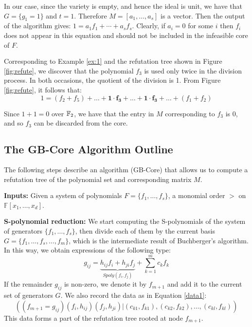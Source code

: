\begin{Proof}
In our case, since the variety is empty, and hence the ideal is
unit, we have that $G = \{g_1=1\}$ and $t=1$. Therefore $M=
[a_1, \ldots, a_s]$ is a vector. Then the output of the algorithm
gives: $1 = a_1f_1+\cdots + a_s f_s.$ Clearly, if $a_i=0$ for some $i$ then
$f_i$ does not appear in this equation and should not be included in
the infeasible core of $F$. 

\end{Proof}


\begin{Example}

Corresponding to Example \ref{ex:1} and the refutation tree shown in
Figure \ref{fig:refute}, we discover that the polynomial $f_3$ is used
only twice in the division process. In both occasions, the quotient of
the division is 1. From Figure \ref{fig:refute}, it follows that:
\begin{equation}
1 = (f_2 + f_5) + \dots + \mathbf{1\cdot f_3} + \dots + \mathbf{1\cdot
  f_3}+ \dots + (f_1 + f_2)
\end{equation}

Since $1 + 1 = 0$ over ${\mathbb{F}}_2$, we have that the entry in $M$
corresponding to $f_3$ is 0, and so $f_3$ can be discarded from the
core. 
\end{Example}

\subsection{The GB-Core Algorithm Outline}

The following steps describe an algorithm (GB-Core) that allows us to compute a
refutation tree of the polynomial set and corresponding matrix $M$. 

{\bf Inputs:} Given a system of polynomials $F=\{f_1,\ldots,f_s\}$, a
monomial order $>$ on $\mathbb{F}[x_1,\ldots,x_d]$.  

{\bf S-polynomial reduction:} We start computing the S-polynomials of the system of
generators $\{f_1,\ldots,f_s\}$, then divide each of them by the
current basis $G=\{f_1,\dots,f_s,\dots,f_m\}$, which is the
intermediate result of Buchberger's algorithm.  
In this way, we obtain expressions of the following type:
\begin{equation}
\label{eqn:red}
g_{ij}= \underbrace{h_{ij}f_{i}+h_{ji}f_{j}}_{Spoly(f_i,f_j)}+\displaystyle\sum_{k=1}^m c_kf_k
\end{equation}
If the remainder $g_{ij}$ is non-zero, we denote it by
$f_{m+1}$ and add it to the current set of generators $G$. We
also record the data as in Equation \ref{data1}: 
\begin{displaymath}
((f_{m+1}=g_{ij})(f_{i},h_{ij})(f_{j},h_{ji})| (c_{k1},f_{k1}),(c_{k2},f_{k2}),\dots,(c_{kl},f_{kl}))
\end{displaymath}
This data forms a part of the refutation tree rooted at node $f_{m+1}$.

